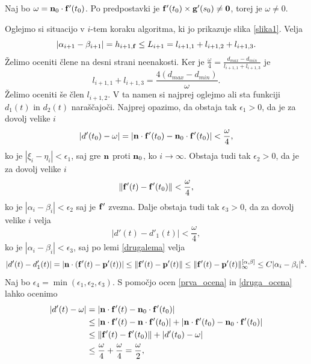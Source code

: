 Naj bo $\omega = {\bf n}_0\cdot {\bf f}'(t_0)$. Po predpostavki je ${\bf f}'(t_0)\times {\bf g}'(s_0) \neq {\bf 0}$, torej je $\omega \neq 0$.

Oglejmo si situacijo v $i$-tem koraku algoritma, ki jo prikazuje slika \ref{slika1}. Velja 
$$
|\alpha _{i+1}-\beta _{i+1}| = h_{i+1,{\bf f}} \leq L_{i+1} = l_{i+1,1} + l_{i+1,2} + l_{i+1,3}.
$$
Želimo oceniti člene na desni strani neenakosti. Ker je $\frac{\omega}{4} = \frac{d_{max}-d_{min}}{l_{i+1,1}  + l_{i+1,3}}$ je
\begin{equation}
l_{i+1,1}  + l_{i+1,3} = \frac{4(d_{max} - d_{min})}{\omega}.
\end{equation}
Želimo oceniti še člen $l_{i+1,2}$. V ta namen si najprej oglejmo ali sta funkciji $d_1(t)$ in $d_2(t)$ naraščajoči. Najprej opazimo, da obstaja tak $\epsilon _1>0$, da je za dovolj velike $i$  
\begin{equation}\label{prva_ocena}
|d'(t_0) - \omega| = |{\bf n}\cdot {\bf f}'(t_0) - {\bf n}_0 \cdot {\bf f}'(t_0)| < \frac{\omega}{4},
\end{equation}
ko je $|\xi _i - \eta _i| < \epsilon _1$, saj gre ${\bf n}$ proti ${\bf n}_0$, ko $i\rightarrow\infty$. Obstaja tudi tak $\epsilon _2 > 0$, da je za dovolj velike $i$
\begin{equation}\label{druga_ocena}
\lVert {\bf f}'(t) - {\bf f}'(t_0)\rVert < \frac{\omega}{4},
\end{equation}
ko je $|\alpha _i - \beta _i| < \epsilon _2$ saj je ${\bf f}'$ zvezna. Dalje obstaja tudi tak $\epsilon _3 > 0$, da za dovolj velike $i$ velja
\begin{equation}\label{tretja_ocena}
|d'(t)-d'_1(t)| < \frac{\omega}{4},
\end{equation}
ko je $|\alpha _i - \beta _i| < \epsilon _3$, saj po lemi \ref{drugalema} velja
$$
|d'(t)-d'_1(t)| = |{\bf n}\cdot ({\bf f}'(t) - {\bf p}'(t))| \leq \lVert {\bf f}'(t) - {\bf p}'(t) \rVert \leq \lVert {\bf f}'(t) - {\bf p}'(t) \rVert _{\infty}^{[\alpha,\beta]} \leq C|\alpha _i- \beta_i|^k.
$$
Naj bo $\epsilon _4 = \min (\epsilon _1, \epsilon _2, \epsilon _3)$. S pomočjo ocen \ref{prva_ocena} in \ref{druga_ocena} lahko ocenimo
\begin{equation*}
\begin{split}
|d'(t)-\omega| & = |{\bf n}\cdot {\bf f}'(t) - {\bf n}_0\cdot{\bf f}'(t_0)| \\
& \leq |{\bf n}\cdot {\bf f}'(t) - {\bf n}\cdot{\bf f}'(t_0)| + 
|{\bf n}\cdot {\bf f}'(t_0) - {\bf n}_0\cdot{\bf f}'(t_0)|\\
&\leq \lVert {\bf f}'(t) - {\bf f}'(t_0)\rVert + |d'(t_0)-\omega|\\
&\leq \frac{\omega}{4} + \frac{\omega}{4} = \frac{\omega}{2},
\end{split}
\end{equation*}
